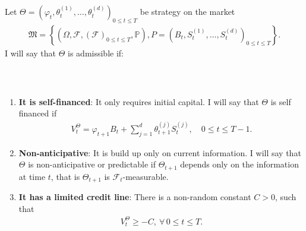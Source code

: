\documentclass{beamer}
\numberwithin{equation}{section}
\begin{document}
\begin{frame}\frametitle{{\normalsize \secname} \\ {\large \subsecname}}
    \begin{definition}
        \begingroup
        Let $\Theta = \left(\varphi_t, \theta_t^{(1)}, \ldots, \theta_t^{(d)}\right)_{0 \leq t \leq T}$ be strategy on the market
        \begin{align}
            \mathfrak{M} =
            \left\{
                \left(
                    \Omega, 
                    \mathscr{F}, 
                    \left(
                        \mathscr{F}
                    \right)_{0 \leq t \leq T},
                    \mathbb{P}
                \right),
                P =
                \left(
                    B_t,
                    S_t^{(1)},
                    \ldots,
                    S_t^{(d)}
                \right)_{0 \leq t \leq T}
            \right\}.
        \end{align}
        I will say that $\Theta$ is admissible if:
        \endgroup
    \end{definition}
\end{frame}

\begin{frame}\frametitle{{\normalsize \secname} \\ {\large \subsecname}}
    \begin{enumerate}
        \item \textbf{It is self-financed}: It only requires initial capital.
        I will say that $\Theta$ is self financed if
        \begin{align}
            V_t^{\Theta} = \varphi_{t+1}B_t + \sum_{j=1}^d \theta_{t+1}^{(j)}S_t^{(j)}, \quad 0 \leq t \leq T-1. 
        \end{align}
        \item \textbf{Non-anticipative}: It is build up only on current information.
        I will say that $\Theta$ is non-anticipative or predictable if $\Theta_{t+1}$ depends only on the information at time $t$, that is $\Theta_{t+1}$ is $\mathscr{F}_t$-measurable.
        \item \textbf{It has a limited credit line}: There is a non-random constant $C > 0$, such that
        \begin{align}
            V_t^{\Theta} \geq -C, \ \forall \, 0 \leq t \leq T.
        \end{align}
    \end{enumerate}
\end{frame}
\end{document}
